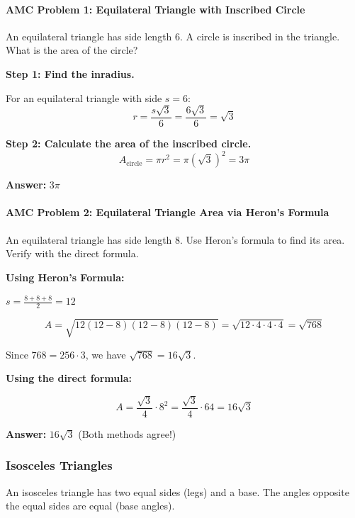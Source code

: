 ﻿\documentclass[12pt]{extarticle}
\begin{document}
\paragraph{AMC Problem 1: Equilateral Triangle with Inscribed Circle}
An equilateral triangle has side length 6. A circle is inscribed in the triangle. What is the area of the circle?

\begin{solutionbox}
\textbf{Step 1: Find the inradius.}

For an equilateral triangle with side $s = 6$:
\[r = \frac{s\sqrt{3}}{6} = \frac{6\sqrt{3}}{6} = \sqrt{3}\]

\textbf{Step 2: Calculate the area of the inscribed circle.}
\[A_{\text{circle}} = \pi r^2 = \pi(\sqrt{3})^2 = 3\pi\]

\textbf{Answer:} $\boxed{3\pi}$
\end{solutionbox}

\paragraph{AMC Problem 2: Equilateral Triangle Area via Heron's Formula}
An equilateral triangle has side length 8. Use Heron's formula to find its area. Verify with the direct formula.

\begin{solutionbox}
\textbf{Using Heron's Formula:}

$s = \frac{8+8+8}{2} = 12$

\[A = \sqrt{12(12-8)(12-8)(12-8)} = \sqrt{12 \cdot 4 \cdot 4 \cdot 4} = \sqrt{768}\]

Since $768 = 256 \cdot 3$, we have $\sqrt{768} = 16\sqrt{3}$.

\textbf{Using the direct formula:}

\[A = \frac{\sqrt{3}}{4} \cdot 8^2 = \frac{\sqrt{3}}{4} \cdot 64 = 16\sqrt{3}\]

\textbf{Answer:} $\boxed{16\sqrt{3}}$ \quad (Both methods agree!)
\end{solutionbox}

\subsubsection{Isosceles Triangles}

An isosceles triangle has two equal sides (legs) and a base. The angles opposite the equal sides are equal (base angles).
\end{document}
